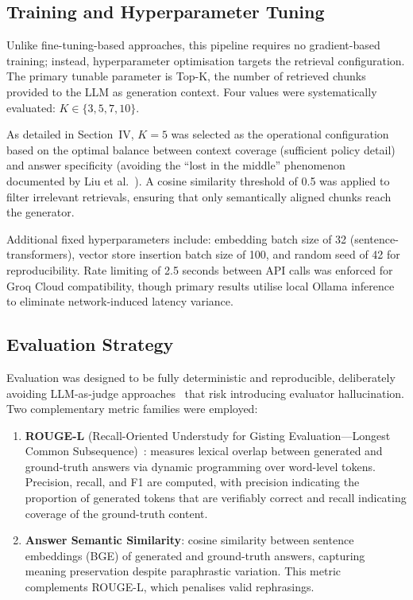 \documentclass[conference]{IEEEtran}
\begin{document}
\subsection{Training and Hyperparameter Tuning}

Unlike fine-tuning-based approaches, this pipeline requires no gradient-based training; instead, hyperparameter optimisation targets the retrieval configuration. The primary tunable parameter is Top-K, the number of retrieved chunks provided to the LLM as generation context. Four values were systematically evaluated: $K \in \{3, 5, 7, 10\}$.

As detailed in Section~IV, $K{=}5$ was selected as the operational configuration based on the optimal balance between context coverage (sufficient policy detail) and answer specificity (avoiding the ``lost in the middle'' phenomenon documented by Liu et al.~\cite{liu2024lost}). A cosine similarity threshold of 0.5 was applied to filter irrelevant retrievals, ensuring that only semantically aligned chunks reach the generator.

Additional fixed hyperparameters include: embedding batch size of 32 (sentence-transformers), vector store insertion batch size of 100, and random seed of 42 for reproducibility. Rate limiting of 2.5 seconds between API calls was enforced for Groq Cloud compatibility, though primary results utilise local Ollama inference to eliminate network-induced latency variance.

\subsection{Evaluation Strategy}

Evaluation was designed to be fully deterministic and reproducible, deliberately avoiding LLM-as-judge approaches~\cite{es2024ragas} that risk introducing evaluator hallucination. Two complementary metric families were employed:

\begin{enumerate}[noitemsep]
    \item \textbf{ROUGE-L} (Recall-Oriented Understudy for Gisting Evaluation---Longest Common Subsequence)~\cite{lin2004rouge}: measures lexical overlap between generated and ground-truth answers via dynamic programming over word-level tokens. Precision, recall, and F1 are computed, with precision indicating the proportion of generated tokens that are verifiably correct and recall indicating coverage of the ground-truth content.
    \item \textbf{Answer Semantic Similarity}: cosine similarity between sentence embeddings (BGE) of generated and ground-truth answers, capturing meaning preservation despite paraphrastic variation. This metric complements ROUGE-L, which penalises valid rephrasings.
\end{enumerate}
\end{document}
